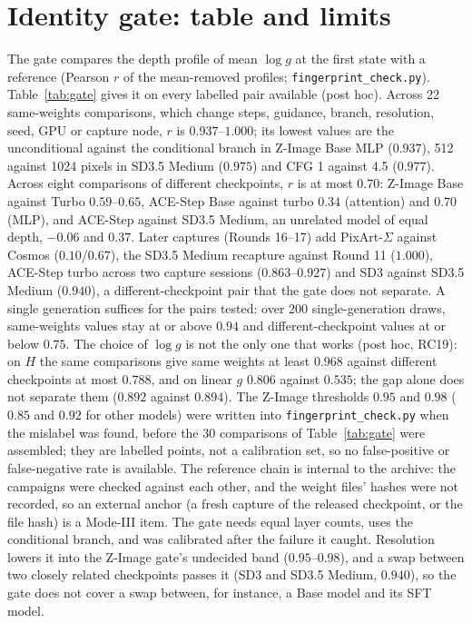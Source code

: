 \section{Identity gate: table and limits}\label{supp:gate}
The gate compares the depth profile of mean $\log g$ at the first state with a reference (Pearson $r$ of the mean-removed profiles; \texttt{fingerprint\_check.py}). Table~\ref{tab:gate} gives it on every labelled pair available (post hoc). Across 22 same-weights comparisons, which change steps, guidance, branch, resolution, seed, GPU or capture node, $r$ is $0.937$--$1.000$; its lowest values are the unconditional against the conditional branch in Z-Image Base MLP ($0.937$), 512 against 1024 pixels in SD3.5 Medium ($0.975$) and CFG 1 against 4.5 ($0.977$). Across eight comparisons of different checkpoints, $r$ is at most $0.70$: Z-Image Base against Turbo $0.59$--$0.65$, ACE-Step Base against turbo $0.34$ (attention) and $0.70$ (MLP), and ACE-Step against SD3.5 Medium, an unrelated model of equal depth, $-0.06$ and $0.37$. Later captures (Rounds 16--17) add PixArt-$\Sigma$ against Cosmos ($0.10$/$0.67$), the SD3.5 Medium recapture against Round 11 ($1.000$), ACE-Step turbo across two capture sessions ($0.863$--$0.927$) and SD3 against SD3.5 Medium ($0.940$), a different-checkpoint pair that the gate does not separate. A single generation suffices for the pairs tested: over 200 single-generation draws, same-weights values stay at or above $0.94$ and different-checkpoint values at or below $0.75$. The choice of $\log g$ is not the only one that works (post hoc, RC19): on $H$ the same comparisons give same weights at least $0.968$ against different checkpoints at most $0.788$, and on linear $g$ $0.806$ against $0.535$; the gap alone does not separate them ($0.892$ against $0.894$). The Z-Image thresholds $0.95$ and $0.98$ ($0.85$ and $0.92$ for other models) were written into \texttt{fingerprint\_check.py} when the mislabel was found, before the 30 comparisons of Table~\ref{tab:gate} were assembled; they are labelled points, not a calibration set, so no false-positive or false-negative rate is available. The reference chain is internal to the archive: the campaigns were checked against each other, and the weight files' hashes were not recorded, so an external anchor (a fresh capture of the released checkpoint, or the file hash) is a Mode-III item. The gate needs equal layer counts, uses the conditional branch, and was calibrated after the failure it caught. Resolution lowers it into the Z-Image gate's undecided band ($0.95$--$0.98$), and a swap between two closely related checkpoints passes it (SD3 and SD3.5 Medium, $0.940$), so the gate does not cover a swap between, for instance, a Base model and its SFT model.

